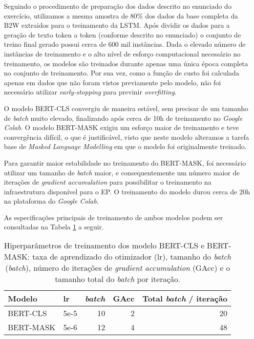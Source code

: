 \documentclass{article}
\begin{document}
Seguindo o procedimento de preparação dos dados descrito no enunciado do exercício, utilizamos a mesma amostra de 80\% dos dados da base completa da B2W extraidos para o treinamento da LSTM. Após dividir os dados para a geração de texto token a token (conforme descrito no enunciado) o conjunto de treino final gerado possui cerca de 600 mil instâncias. Dada o elevado número de instâncias de treinamento e o alto nível de esforço computacional necessário no treinamento, os modelos são treinados durante apenas uma única época completa no conjunto de treinamento. Por sua vez, como a função de custo foi calculada apenas em dados que não foram vistos previamente pelo modelo, não foi necessário utilizar \textit{early-stopping} para previnir \textit{overfitting}.

O modelo BERT-CLS convergiu de maneira estável, sem precisar de um tamanho de \textit{batch} muito elevado, finalizando após cerca de 10h de treinamento no \textit{Google Colab}. O modelo BERT-MASK exigiu  um esforço maior de treinamento e teve convergência difícil, o que é justificável, visto que neste modelo alteramos a tarefa base de \textit{Masked Language Modelling} em que o modelo foi originalmente treinado.

Para garantir maior estabilidade no treinamento do BERT-MASK, foi necessário utilizar um tamanho de \textit{batch} maior, e consequentemente um número maior de iterações de \textit{gradient accumulation} para possibilitar o treinamento na infraestrutura disponível para o EP. O treinamento do modelo durou cerca de 20h na plataforma do \textit{Google Colab}.


As especificações principais de treinamento de ambos modelos podem ser consultadas na Tabela \ref{hyp} a seguir.

\begin{table}[h!]
	\centering
	\begin{tabular}{@{}lrrrr@{}}
		\toprule
		Modelo    & \multicolumn{1}{l}{lr} & \multicolumn{1}{l}{ \textit{batch}} & \multicolumn{1}{l}{GAcc} & \multicolumn{1}{l}{Total \textit{batch} / iteração} \\ \midrule
		BERT-CLS  & 5e-5                   & 10                                & 2                        & 20                                                 \\
		BERT-MASK & 5e-6                   & 12                                & 4                        & 48                                                 \\ \bottomrule
	\end{tabular}
	\caption{Hiperparâmetros de treinamento dos modelo BERT-CLS e BERT-MASK: taxa de aprendizado do otimizador (lr), tamanho do \textit{batch} (\textit{batch}), número de iterações de \textit{gradient accumulation} (GAcc) e o tamanho total do \textit{batch} por iteração.}
	\label{hyp}
\end{table}
\end{document}
